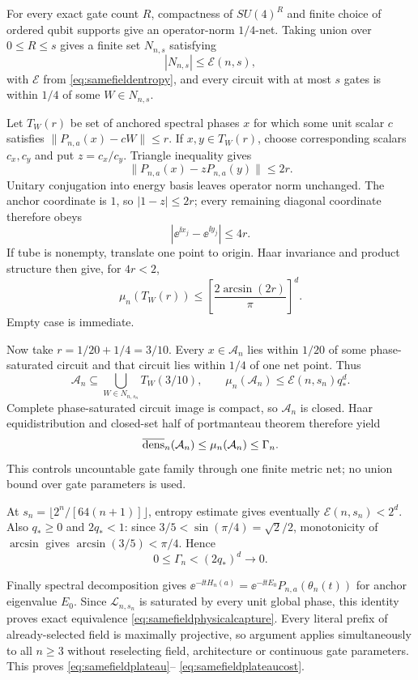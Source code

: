 For every exact gate count $R$, compactness of $SU(4)^R$ and finite choice of
ordered qubit supports give an operator-norm $1/4$-net.  Taking union over
$0\le R\le s$ gives a finite set $N_{n,s}$ satisfying
\begin{equation}
 |N_{n,s}|\le\mathcal E(n,s),                         \label{eq:samefieldnetcard}
\end{equation}
with $\mathcal E$ from \eqref{eq:samefieldentropy}, and every circuit with at
most $s$ gates is within $1/4$ of some $W\in N_{n,s}$.

Let $T_W(r)$ be set of anchored spectral phases $x$ for which some unit
scalar $c$ satisfies $\|P_{n,a}(x)-cW\|\le r$.  If
$x,y\in T_W(r)$, choose corresponding scalars $c_x,c_y$ and put
$z=c_x/c_y$.  Triangle inequality gives
\[
 \|P_{n,a}(x)-zP_{n,a}(y)\|\le2r.
\]
Unitary conjugation into energy basis leaves operator norm unchanged.  The
anchor coordinate is $1$, so $|1-z|\le2r$; every remaining diagonal
coordinate therefore obeys
\[
 |\ee^{\ii x_j}-\ee^{\ii y_j}|\le4r.
\]
If tube is nonempty, translate one point to origin.  Haar invariance and
product structure then give, for $4r<2$,
\begin{equation}
 \mu_n(T_W(r))\le
 \left[\frac{2\arcsin(2r)}{\pi}\right]^d.           \label{eq:samefieldtubebound}
\end{equation}
Empty case is immediate.

Now take $r=1/20+1/4=3/10$.  Every $x\in\mathcal A_n$ lies within $1/20$
of some phase-saturated circuit and that circuit lies within $1/4$ of one
net point.  Thus
\[
 \mathcal A_n\subseteq\bigcup_{W\in N_{n,s_n}}T_W(3/10),
 \qquad
 \mu_n(\mathcal A_n)\le\mathcal E(n,s_n)q_*^d.
\]
Complete phase-saturated circuit image is compact, so $\mathcal A_n$ is
closed.  Haar equidistribution and closed-set half of portmanteau theorem
therefore yield
\[
 \overline{\operatorname{dens}}_n(\mathcal A_n)
 \le\mu_n(\mathcal A_n)\le\Gamma_n.
\]
This controls uncountable gate family through one finite metric net; no union
bound over gate parameters is used.

At $s_n=\lfloor2^n/[64(n+1)]\rfloor$, entropy estimate gives eventually
$\mathcal E(n,s_n)<2^d$.  Also $q_*\ge0$ and $2q_*<1$: since
$3/5<\sin(\pi/4)=\sqrt2/2$, monotonicity of $\arcsin$ gives
$\arcsin(3/5)<\pi/4$.  Hence
\[
 0\le\Gamma_n< (2q_*)^d\longrightarrow0.
\]

Finally spectral decomposition gives
$\ee^{-\ii tH_n(a)}=\ee^{-\ii tE_0}P_{n,a}(\theta_n(t))$ for anchor
eigenvalue $E_0$.  Since $\mathcal L_{n,s_n}$ is saturated by every unit
global phase, this identity proves exact equivalence
\eqref{eq:samefieldphysicalcapture}.  Every literal prefix of already-selected
field is maximally projective, so argument applies simultaneously to all
$n\ge3$ without reselecting field, architecture or continuous gate
parameters.  This proves \eqref{eq:samefieldplateau}--
\eqref{eq:samefieldplateaucost}.

